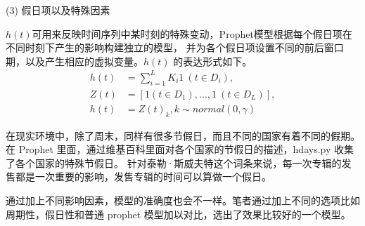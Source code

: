(3) 假日项以及特殊因素

$h(t)$可用来反映时间序列中某时刻的特殊变动，Prophet模型根据每个假日项在不同时刻下产生的影响构建独立的模型，
并为各个假日项设置不同的前后窗口期，以及产生相应的虚拟变量\cite{JSJA2019S1097}。$h(t)$ 的表达形式如下。
\begin{align}
  h(t)&=\sum_{i=1}^{L}K_{i}1\ (t\in D_{i}), \\
  Z(t)&=[1(t\in D_{1}),...,1\ (t\in D_{L})], \\
  h(t)&=Z(t)_{k},k\sim normal(0, \gamma)
\end{align}

在现实环境中，除了周末，同样有很多节假日，而且不同的国家有着不同的假期。
在 Prophet 里面，通过维基百科里面对各个国家的节假日的描述，hdays.py 收集了各个国家的特殊节假日。
针对泰勒·斯威夫特这个词条来说，每一次专辑的发售都是一次重要的影响，发售专辑的时间可以算做一个假日。

通过加上不同影响因素，模型的准确度也会不一样。笔者通过加上不同的选项比如周期性，假日性和普通 prophet 模型加以对比，选出了效果比较好的一个模型。

